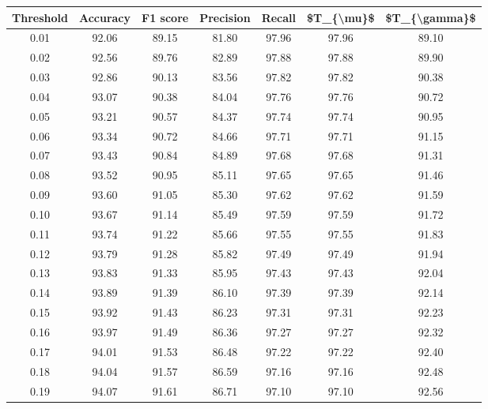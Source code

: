 \begin{tabular}{|c|c|c|c|c|c|c|}
\hline
 Threshold &  Accuracy &  F1 score &  Precision &  Recall &  \$T\_\{\textbackslash mu\}\$ &  \$T\_\{\textbackslash gamma\}\$ \\
\hline
      0.01 &     92.06 &     89.15 &      81.80 &   97.96 &      97.96 &         89.10 \\
      0.02 &     92.56 &     89.76 &      82.89 &   97.88 &      97.88 &         89.90 \\
      0.03 &     92.86 &     90.13 &      83.56 &   97.82 &      97.82 &         90.38 \\
      0.04 &     93.07 &     90.38 &      84.04 &   97.76 &      97.76 &         90.72 \\
      0.05 &     93.21 &     90.57 &      84.37 &   97.74 &      97.74 &         90.95 \\
      0.06 &     93.34 &     90.72 &      84.66 &   97.71 &      97.71 &         91.15 \\
      0.07 &     93.43 &     90.84 &      84.89 &   97.68 &      97.68 &         91.31 \\
      0.08 &     93.52 &     90.95 &      85.11 &   97.65 &      97.65 &         91.46 \\
      0.09 &     93.60 &     91.05 &      85.30 &   97.62 &      97.62 &         91.59 \\
      0.10 &     93.67 &     91.14 &      85.49 &   97.59 &      97.59 &         91.72 \\
      0.11 &     93.74 &     91.22 &      85.66 &   97.55 &      97.55 &         91.83 \\
      0.12 &     93.79 &     91.28 &      85.82 &   97.49 &      97.49 &         91.94 \\
      0.13 &     93.83 &     91.33 &      85.95 &   97.43 &      97.43 &         92.04 \\
      0.14 &     93.89 &     91.39 &      86.10 &   97.39 &      97.39 &         92.14 \\
      0.15 &     93.92 &     91.43 &      86.23 &   97.31 &      97.31 &         92.23 \\
      0.16 &     93.97 &     91.49 &      86.36 &   97.27 &      97.27 &         92.32 \\
      0.17 &     94.01 &     91.53 &      86.48 &   97.22 &      97.22 &         92.40 \\
      0.18 &     94.04 &     91.57 &      86.59 &   97.16 &      97.16 &         92.48 \\
      0.19 &     94.07 &     91.61 &      86.71 &   97.10 &      97.10 &         92.56 \\

\end{tabular}
